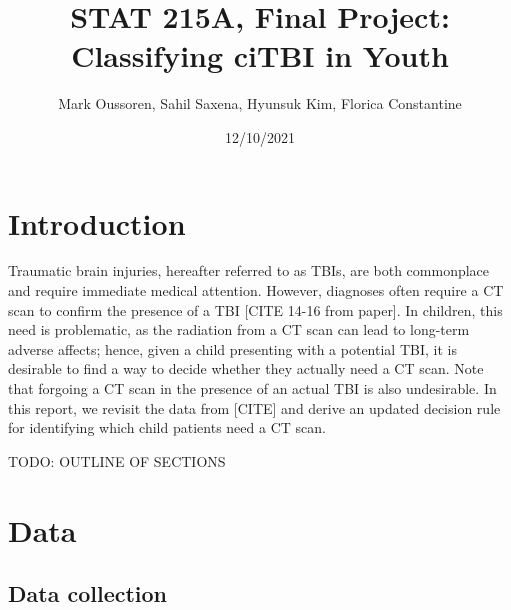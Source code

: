 \documentclass[11pt]{amsart}
\title{STAT 215A, Final Project: Classifying ciTBI in Youth}
\author{Mark Oussoren, Sahil Saxena, Hyunsuk Kim, Florica Constantine}
\date{12/10/2021}                                           %
\begin{document}
\maketitle


\section{Introduction}


Traumatic brain injuries, hereafter referred to as TBIs, are both commonplace and require immediate medical attention. However, diagnoses often require a CT scan to confirm the presence of a TBI [CITE 14-16 from paper]. In children, this need is problematic, as the radiation from a CT scan can lead to long-term adverse affects; hence, given a child presenting with a potential TBI, it is desirable to find a way to decide whether they actually need a CT scan. Note that forgoing a CT scan in the presence of an actual TBI is also undesirable. In this report, we revisit the data from [CITE] and derive an updated decision rule for identifying which child patients need a CT scan. 

TODO: OUTLINE OF SECTIONS

\section{Data}

\subsection{Data collection}

\end{document}
